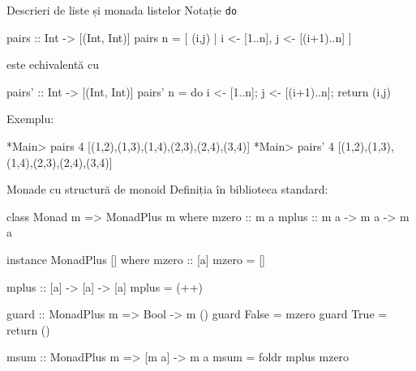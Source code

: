 \documentclass[xcolor=pdftex,romanian,colorlinks]{beamer}
\begin{document}
%
%
%






\begin{frame}[fragile]{Descrieri de liste și monada listelor}
{Notație \lstinline$do$}
\begin{asciihs}
   pairs :: Int -> [(Int, Int)]
   pairs n = [ (i,j) | i <- [1..n], j <- [(i+1)..n] ]
\end{asciihs}
este echivalentă cu
\begin{asciihs}
   pairs' :: Int -> [(Int, Int)]
   pairs' n = do {
                  i <- [1..n];
                  j <- [(i+1)..n];
                  return (i,j)
                }
\end{asciihs}
Exemplu:
\begin{asciihs}
   *Main> pairs 4
   [(1,2),(1,3),(1,4),(2,3),(2,4),(3,4)]
   *Main> pairs' 4
   [(1,2),(1,3),(1,4),(2,3),(2,4),(3,4)]
\end{asciihs}
\end{frame}


\begin{frame}[fragile]{Monade cu structură de monoid}
\vspace{-1ex}
Definiția în biblioteca standard:
\begin{asciihs}
   class Monad m => MonadPlus m where
     mzero :: m a
     mplus :: m a -> m a -> m a

   instance MonadPlus [] where
      mzero     :: [a]
      mzero     = []

      mplus     :: [a] -> [a] -> [a]
      mplus     = (++)

   guard :: MonadPlus m => Bool -> m ()
   guard False = mzero
   guard True   = return ()

   msum :: MonadPlus m => [m a] -> m a
   msum = foldr mplus mzero
\end{asciihs}
\end{frame}
\end{document}
